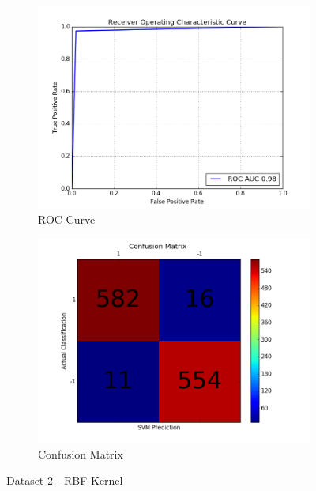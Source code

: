 \begin{figure}[h]
	
	\begin{subfigure}{0.5\textwidth}
		\includegraphics[width=0.9\linewidth]{images/AUC-Dataset2-rbf} 
		\caption{ROC Curve}
		\label{fig:AUC_Dataset2_rbf}
	\end{subfigure}
	\begin{subfigure}{0.5\textwidth}
		\includegraphics[width=0.9\linewidth]{images/CM-Dataset2-rbf}
		\caption{Confusion Matrix}
		\label{fig:CM_Dataset2_rbf}
	\end{subfigure}
	
	\caption{Dataset 2 - RBF Kernel}
	\label{fig:Dataset2_rbf_results}
\end{figure}


